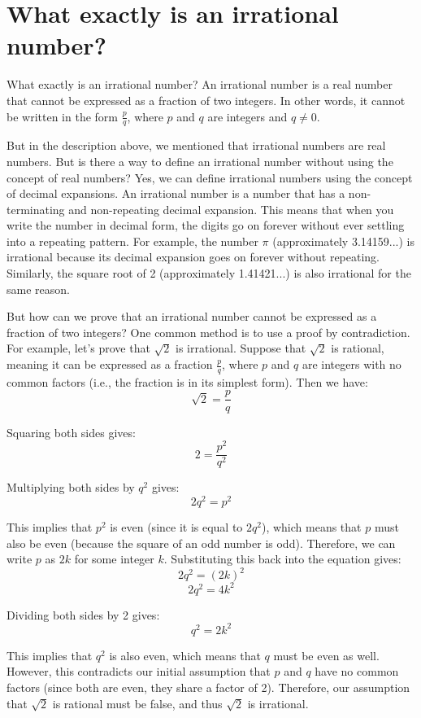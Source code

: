 \documentclass[12pt, letterpaper, oneside]{article}
\begin{document}
\section{What exactly is an irrational number?}

What exactly is an irrational number? An irrational number is a real number that cannot be expressed as a fraction
of two integers. In other words, it cannot be written in the form \(\frac{p}{q}\), where \(p\) and \(q\) are integers
and \(q \neq 0\).

But in the description above, we mentioned that irrational numbers are real numbers. But is there a way to define an
irrational number without using the concept of real numbers? Yes, we can define irrational numbers using the concept of
decimal expansions. An irrational number is a number that has a non-terminating and non-repeating decimal expansion.
This means that when you write the number in decimal form, the digits go on forever without ever settling into a
repeating pattern. For example, the number \(\pi\) (approximately 3.14159...) is irrational because its decimal
expansion goes on forever without repeating. Similarly, the square root of 2 (approximately 1.41421...) is also
irrational for the same reason.

But how can we prove that an irrational number cannot be expressed as a fraction of two integers? One common method is
to use a proof by contradiction. For example, let's prove that \(\sqrt{2}\) is irrational. Suppose that \(\sqrt{2}\) is
rational, meaning it can be expressed as a fraction \(\frac{p}{q}\), where \(p\) and \(q\) are integers with no common
factors (i.e., the fraction is in its simplest form). Then we have:
\[\sqrt{2} = \frac{p}{q}\]

Squaring both sides gives:
\[2 = \frac{p^2}{q^2}\]

Multiplying both sides by \(q^2\) gives:
\[2q^2 = p^2\]

This implies that \(p^2\) is even (since it is equal to \(2q^2\)), which means that \(p\) must also be even (because
the square of an odd number is odd). Therefore, we can write \(p\) as \(2k\) for some integer \(k\). Substituting this
back into the equation gives:
\[2q^2 = (2k)^2\]
\[2q^2 = 4k^2\]

Dividing both sides by 2 gives:
\[q^2 = 2k^2\]

This implies that \(q^2\) is also even, which means that \(q\) must be even as well. However, this contradicts our
initial assumption that \(p\) and \(q\) have no common factors (since both are even, they share a factor of 2).
Therefore, our assumption that \(\sqrt{2}\) is rational must be false, and thus \(\sqrt{2}\) is irrational.
\end{document}
